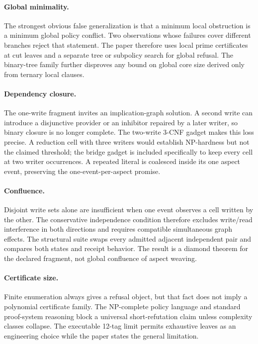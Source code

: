 \paragraph{Global minimality.}
The strongest obvious false generalization is that a minimum local obstruction is a
minimum global policy conflict.  Two observations whose failures cover different
branches reject that statement.  The paper therefore uses local prime certificates at
cut leaves and a separate tree or subpolicy search for global refusal.  The binary-tree
family further disproves any bound on global core size derived only from ternary local
clauses.

\paragraph{Dependency closure.}
The one-write fragment invites an implication-graph solution.  A second write can
introduce a disjunctive provider or an inhibitor repaired by a later writer, so binary
closure is no longer complete.  The two-write 3-CNF gadget makes this loss precise.
A reduction cell with three writers would establish NP-hardness but not the claimed
threshold; the bridge gadget is included specifically to keep every cell at two
writer occurrences.  A repeated literal is coalesced inside its one aspect event,
preserving the one-event-per-aspect promise.

\paragraph{Confluence.}
Disjoint write sets alone are insufficient when one event observes a cell written by
the other.  The conservative independence condition therefore excludes write/read
interference in both directions and requires compatible simultaneous graph effects.
The structural suite swaps every admitted adjacent independent pair and compares both
states and receipt behavior.  The result is a diamond theorem for the declared
fragment, not global confluence of aspect weaving.

\paragraph{Certificate size.}
Finite enumeration always gives a refusal object, but that fact does not imply a
polynomial certificate family.  The NP-complete policy language and standard
proof-system reasoning block a universal short-refutation claim unless complexity
classes collapse.  The executable 12-tag limit permits exhaustive leaves as an
engineering choice while the paper states the general limitation.

